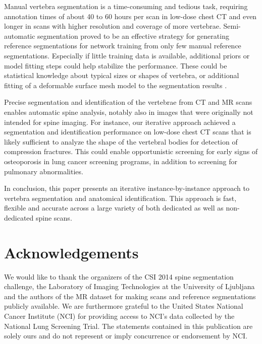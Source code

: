 \documentclass[authoryear,5p,final,times]{elsarticle}
\begin{document}
    Manual vertebra segmentation is a time-consuming and tedious task, requiring annotation times of about 40 to 60 hours per scan in low-dose chest CT and even longer in scans with higher resolution and coverage of more vertebrae. Semi-automatic segmentation proved to be an effective strategy for generating reference segmentations for network training from only few manual reference segmentations. Especially if little training data is available, additional priors or model fitting steps could help stabilize the performance. These could be statistical knowledge about typical sizes or shapes of vertebra, or additional fitting of a deformable surface mesh model to the segmentation results \citep{Korez2016}.

    Precise segmentation and identification of the vertebrae from CT and MR scans enables automatic spine analysis, notably also in images that were originally not intended for spine imaging. For instance, our iterative approach achieved a segmentation and identification performance on low-dose chest CT scans that is likely sufficient to analyze the shape of the vertebral bodies for detection of compression fractures. This could enable opportunistic screening for early signs of osteoporosis in lung cancer screening programs, in addition to screening for pulmonary abnormalities.

    In conclusion, this paper presents an iterative instance-by-instance approach to vertebra segmentation and anatomical identification. This approach is fast, flexible and accurate across a large variety of both dedicated as well as non-dedicated spine scans.

    \section*{Acknowledgements}

    \noindent
    We would like to thank the organizers of the CSI 2014 spine segmentation challenge, the Laboratory of Imaging Technologies at the University of Ljubljana and the authors of the MR dataset for making scans and reference segmentations publicly available. We are furthermore grateful to the United States National Cancer Institute (NCI) for providing access to NCI’s data collected by the National Lung Screening Trial. The statements contained in this publication are solely ours and do not represent or imply concurrence or endorsement by NCI.
\end{document}
